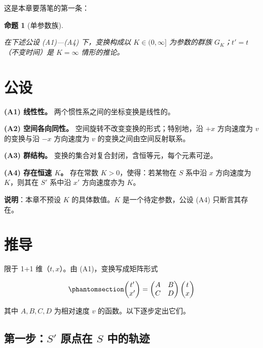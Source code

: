 \documentclass[
  chinese,
  a4paper,
  UTF8,
  12pt,
  oneside,
  openany]{ctexbook}
\theoremstyle{plain}
\theoremstyle{plain}
\theoremstyle{plain}
\newtheorem{proposition}{命题}[chapter]
\theoremstyle{definition}
\theoremstyle{plain}
\theoremstyle{plain}
\theoremstyle{remark}
\begin{document}
这是本章要落笔的第一条：

\begin{proposition}[单参数族]\protect\hypertarget{prp-isg-one-param}{}\label{prp-isg-one-param}

在下述公设 (A1)---(A4) 下，变换构成以 \(K\in(0,\infty]\) 为参数的群族
\(G_K\)；\(t'=t\)（不变时间）是 \(K=\infty\) 情形的推论。

\end{proposition}

\section{公设}\label{sec-isg-axioms}

\textbf{(A1) 线性性。} 两个惯性系之间的坐标变换是线性的。

\textbf{(A2) 空间各向同性。} 空间旋转不改变变换的形式；特别地，沿 \(+x\)
方向速度为 \(v\) 的变换与沿 \(-x\) 方向速度为 \(v\)
的变换之间由空间反射联系。

\textbf{(A3) 群结构。} 变换的集合对复合封闭，含恒等元，每个元素可逆。

\textbf{(A4) 存在恒速 \(K\)。} 存在常数 \(K>0\)，使得：若某物在 \(S\)
系中沿 \(x\) 方向速度为 \(K\)，则其在 \(S'\) 系中沿 \(x'\) 方向速度亦为
\(K\)。

\textbf{说明}：本章不预设 \(K\) 的具体数值。\(K\) 是一个待定参数，公设
(A4) 只断言其存在。

\section{推导}\label{sec-isg-derivation}

限于 1+1 维（\(t,x\)）。由 (A1)，变换写成矩阵形式

\begin{equation}\protect\phantomsection\label{eq-isg-mat}{
\begin{pmatrix} t'\\ x' \end{pmatrix}
=
\begin{pmatrix} A & B\\ C & D \end{pmatrix}
\begin{pmatrix} t\\ x \end{pmatrix}
}\end{equation}

其中 \(A,B,C,D\) 为相对速度 \(v\) 的函数。以下逐步定出它们。

\subsection{\texorpdfstring{第一步：\(S'\) 原点在 \(S\)
中的轨迹}{第一步：S\textquotesingle{} 原点在 S 中的轨迹}}\label{ux7b2cux4e00ux6b65s-ux539fux70b9ux5728-s-ux4e2dux7684ux8f68ux8ff9}
\end{document}
